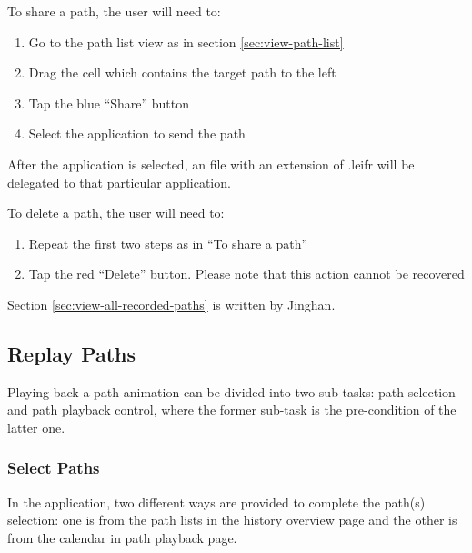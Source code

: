 \documentclass[12pt,a4paper]{article}
\renewcommand\texttt[1]{{\ttfamily\color{textttColor}#1}}
\begin{document}
            To share a path, the user will need to:
            \begin{enumerate}
                \item Go to the path list view as in section \ref{sec:view-path-list}
                \item Drag the cell which contains the target path to the left
                \item Tap the blue ``Share'' button
                \item Select the application to send the path
            \end{enumerate}
            
            After the application is selected, an file with an extension of \texttt{.leifr} will be delegated to that particular application.
            
            To delete a path, the user will need to:
            \begin{enumerate}
                \item Repeat the first two steps as in ``To share a path''
                \item Tap the red ``Delete'' button. Please note that this action cannot be recovered
            \end{enumerate}
            
            \footnotesize
            Section \ref{sec:view-all-recorded-paths} is written by Jinghan.
            \normalsize
            
        \subsection{Replay Paths} %
            \label{sec:replay-paths}
            Playing back a path animation can be divided into two sub-tasks: path selection and path playback control, where the former sub-task is the pre-condition of the latter one.
            
            \subsubsection{Select Paths}
                \label{sec:select-path}
                In the application, two different ways are provided to complete the path(s) selection: one is from the path lists in the history overview page and the other is from the calendar in path playback page.
\end{document}
